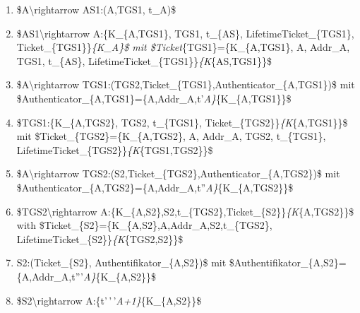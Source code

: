 \documentclass[a4paper]{article}
\begin{document}
\begin{multicols}{3}
\begin{itemize}
              \begin{enumerate}
                  \def\labelenumi{\arabic{enumi}.}
                  \item
                        \$A\textbackslash rightarrow AS1:(A,TGS1, t\_A)\$
                  \item
                        \$AS1\textbackslash rightarrow A:\{K\_\{A,TGS1\}, TGS1, t\_\{AS\},
                        LifetimeTicket\_\{TGS1\}, Ticket\_\{TGS1\}\}\emph{\{K\_A\}\$ mit
                            \$Ticket}\{TGS1\}=\{K\_\{A,TGS1\}, A, Addr\_A, TGS1, t\_\{AS\},
                        LifetimeTicket\_\{TGS1\}\}\emph{\{K}\{AS,TGS1\}\}\$
                  \item
                        \$A\textbackslash rightarrow
                        TGS1:(TGS2,Ticket\_\{TGS1\},Authenticator\_\{A,TGS1\})\$ mit
                        \$Authenticator\_\{A,TGS1\}=\{A,Addr\_A,t'\emph{A\}}\{K\_\{A,TGS1\}\}\$
                  \item
                        \$TGS1:\{K\_\{A,TGS2\}, TGS2, t\_\{TGS1\},
                        Ticket\_\{TGS2\}\}\emph{\{K}\{A,TGS1\}\}\$ mit
                        \$Ticket\_\{TGS2\}=\{K\_\{A,TGS2\}, A, Addr\_A, TGS2, t\_\{TGS1\},
                        LifetimeTicket\_\{TGS2\}\}\emph{\{K}\{TGS1,TGS2\}\}\$
                  \item
                        \$A\textbackslash rightarrow
                        TGS2:(S2,Ticket\_\{TGS2\},Authenticator\_\{A,TGS2\})\$ mit
                        \$Authenticator\_\{A,TGS2\}=\{A,Addr\_A,t''\emph{A\}}\{K\_\{A,TGS2\}\}\$
                  \item
                        \$TGS2\textbackslash rightarrow
                        A:\{K\_\{A,S2\},S2,t\_\{TGS2\},Ticket\_\{S2\}\}\emph{\{K}\{A,TGS2\}\}\$
                        with \$Ticket\_\{S2\}=\{K\_\{A,S2\},A,Addr\_A,S2,t\_\{TGS2\},
                        LifetimeTicket\_\{S2\}\}\emph{\{K}\{TGS2,S2\}\}\$
                  \item
                        S2:(Ticket\_\{S2\}, Authentifikator\_\{A,S2\})\$ mit
                        \$Authentifikator\_\{A,S2\}=\{A,Addr\_A,t'''\emph{A\}}\{K\_\{A,S2\}\}\$
                  \item
                        \$S2\textbackslash rightarrow
                        A:\{t'\,'\,'\emph{A+1\}}\{K\_\{A,S2\}\}\$
              \end{enumerate}
    \end{itemize}



\end{multicols}
\end{document}

